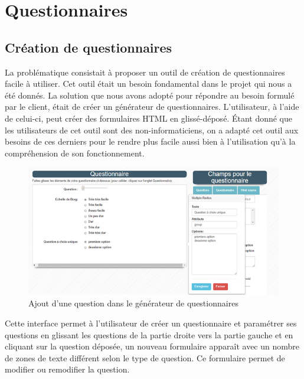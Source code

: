 \section{Questionnaires}

\subsection{Création de questionnaires}
La problématique consistait à proposer un outil de création de questionnaires facile à utiliser. Cet outil était un besoin fondamental dans le projet qui nous a été donnés. La solution que nous avons adopté pour répondre au besoin formulé par le client, était de créer un générateur de questionnaires. L’utilisateur, à l'aide de celui-ci, peut créer des formulaires HTML en glissé-déposé. Étant donné que les utilisateurs de cet outil sont des non-informaticiens, on a adapté cet outil aux besoins de ces derniers pour le rendre plus facile aussi bien à l’utilisation qu'à la compréhension de son fonctionnement.

\begin{figure}[H]
    \begin{center}
	\includegraphics[scale=0.8]{img/questionnaire/modification}
    \end{center}
    \caption{Ajout d'une question dans le générateur de questionnaires}
\end{figure}



Cette interface permet à l'utilisateur de créer un questionnaire et paramétrer ses questions en glissant les questions de la partie droite vers la partie gauche et en cliquant sur la question déposée, un nouveau formulaire apparaît avec un nombre de zones de texte différent selon le type de question. Ce formulaire permet de modifier ou remodifier la question.


